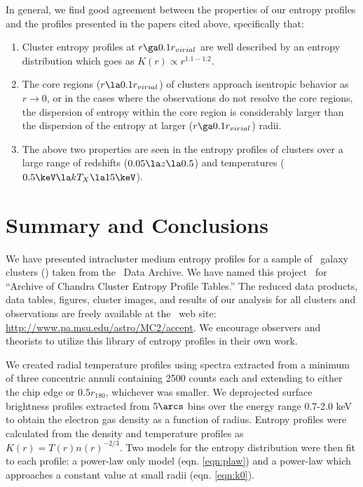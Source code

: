 \documentclass{emulateapj}
\begin{document}
In general, we find good agreement between the properties of our
entropy profiles and the profiles presented in the papers cited above,
specifically that:
\begin{enumerate}
\item Cluster entropy profiles at $r \ga 0.1 r_{virial}$ are well
  described by an entropy distribution which goes as $K(r) \propto
  r^{1.1-1.2}$.
\item The core regions ($r \la 0.1 r_{virial}$) of clusters approach
  isentropic behavior as $r \rightarrow 0$, or in the cases where the
  observations do not resolve the core regions, the dispersion of
  entropy within the core region is considerably larger than the
  dispersion of the entropy at larger ($r \ga 0.1 r_{virial}$) radii.
\item The above two properties are seen in the entropy profiles of
  clusters over a large range of redshifts ($0.05 \la z \la 0.5$) and
  temperatures ($0.5 \keV \la kT_X \la 15 \keV$).
\end{enumerate}  

\section{Summary and Conclusions}
\label{sec:summary}

We have presented intracluster medium entropy profiles for a sample of
\numcluster\ galaxy clusters (\expt) taken from the \chandra\ Data
Archive. We have named this project \accept\ for ``Archive of Chandra
Cluster Entropy Profile Tables.'' The reduced data products, data
tables, figures, cluster images, and results of our analysis for all
clusters and observations are freely available at the \accept\ web
site: \url{http://www.pa.msu.edu/astro/MC2/accept}. We encourage
observers and theorists to utilize this library of entropy profiles in
their own work.

We created radial temperature profiles using spectra extracted from a
minimum of three concentric annuli containing 2500 counts each and
extending to either the chip edge or $0.5 r_{180}$, whichever was
smaller. We deprojected surface brightness profiles extracted from
$5\arcs$ bins over the energy range 0.7-2.0 keV to obtain the electron
gas density as a function of radius. Entropy profiles were calculated
from the density and temperature profiles as $K(r) =
T(r)n(r)^{-2/3}$. Two models for the entropy distribution were then
fit to each profile: a power-law only model (eqn. \ref{eqn:plaw}) and
a power-law which approaches a constant value at small radii
(eqn. \ref{eqn:k0}).
\end{document}
